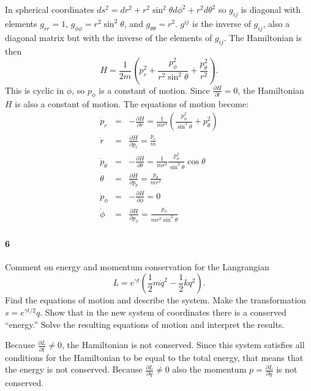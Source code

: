 \documentclass[letterpaper,11pt]{article}
\begin{document}
In spherical coordinates $ds^2 = dr^2 + r^2 \sin^2\theta d\phi^2 + r^2 d\theta^2$ so $g_{ij}$ is diagonal with elements $g_{rr} = 1$, $g_{\phi\phi} = r^2 \sin^2\theta$, and $g_{\theta\theta} = r^2$.  $g^{ij}$ is the inverse of $g_{ij}$, also a diagonal matrix but with the inverse of the elements of $g_{ij}$.  The Hamiltonian is then $$H = \frac{1}{2m} (p_r^2 + \frac{p_\phi^2}{r^2\sin^2\theta} + \frac{p_\theta^2}{r^2}).$$  This is cyclic in $\phi$, so $p_\phi$ is a constant of motion.  Since $\frac{\partial H}{\partial t} = 0$, the Hamiltonian $H$ is also a constant of motion.  The equations of motion become:
\begin{eqnarray*}
 \dot{p}_r & = & -\frac{\partial H}{\partial r} = \frac{1}{mr^3}(\frac{p_\phi^2}{\sin^2\theta} + p_\theta^2) \\
 \dot{r} & = & \frac{\partial H}{\partial p_r} = \frac{p_r}{m} \\
 \dot{p}_\theta & = & -\frac{\partial H}{\partial \theta} =  \frac{1}{mr^2}\frac{p_\phi^2}{\sin^2\theta} \cos\theta \\
 \dot{\theta} & = & \frac{\partial H}{\partial p_\theta} = \frac{p_\theta}{m r^2} \\
 \dot{p}_\phi & = & -\frac{\partial H}{\partial \phi} = 0 \\
 \dot{\phi} & = & \frac{\partial H}{\partial p_\phi} = \frac{p_\phi}{m r^2 \sin^2\theta}
\end{eqnarray*}


\paragraph*{6}

Comment on energy and momentum conservation for the Langrangian
\begin{equation*}
 L = e^{\gamma t} \left( \frac{1}{2}m \dot{q}^2 - \frac{1}{2}k q^2 \right).
\end{equation*}
Find the equations of motion and describe the system.  Make the transformation $s = e^{\gamma t/2}q$.  Show that in the new system of coordinates there is a conserved ``energy.''  Solve the resulting equations of motion and interpret the results.

Because $\frac{\partial L}{\partial t} \ne 0$, the Hamiltonian is not conserved.  Since this system satisfies all conditions for the Hamiltonian to be equal to the total energy, that means that the energy is not conserved.  Because $\frac{\partial L}{\partial q} \ne 0$ also the momentum $p = \frac{\partial L}{\partial \dot{q}}$ is not conserved.
\end{document}
